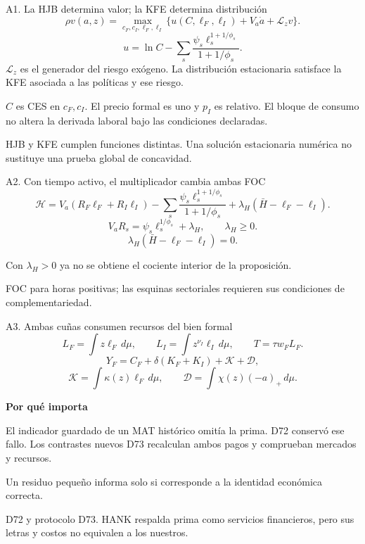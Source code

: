 \documentclass[aspectratio=169,11pt]{beamer}
\newcommand{\source}[1]{\par\vfill{\fontsize{8}{9.5}\selectfont\color{Gray}#1\par}}
\newcommand{\takeaway}[1]{\par\vspace{2mm}\begingroup\setlength{\fboxsep}{2.2mm}\colorbox{Pale}{\begin{minipage}{\dimexpr\linewidth-4.4mm\relax}\small\raggedright #1\end{minipage}}\endgroup\par}
\newcommand{\labeltext}[1]{\par{\small\bfseries\color{Teal}#1\par}\vspace{1.5mm}}
\newcommand{\back}[1]{\hfill\hyperlink{#1}{\beamerreturnbutton{Volver}}}
\begin{document}
\begin{frame}[label=hjb]{A1. La HJB determina valor; la KFE determina distribución}
\[\rho v(a,z)=\max_{c_F,c_I,\ell_F,\ell_I}\{u(C,\ell_F,\ell_I)+V_a\dot a+\mathcal L_zv\}.\]
\[u=\ln C-\sum_s\frac{\psi_s\ell_s^{1+1/\phi_s}}{1+1/\phi_s}.\]
\small $\mathcal L_z$ es el generador del riesgo exógeno. La distribución estacionaria satisface la KFE asociada a las políticas y ese riesgo.\par\vspace{3mm}
$C$ es CES en $c_F,c_I$. El precio formal es uno y $p_I$ es relativo. El bloque de consumo no altera la derivada laboral bajo las condiciones declaradas.
\source{HJB y KFE cumplen funciones distintas. Una solución estacionaria numérica no sustituye una prueba global de concavidad.}\back{hogar}
\end{frame}

\begin{frame}[label=kkt]{A2. Con tiempo activo, el multiplicador cambia ambas FOC}
\[\mathcal H=V_a(R_F\ell_F+R_I\ell_I)-\sum_s\frac{\psi_s\ell_s^{1+1/\phi_s}}{1+1/\phi_s}+\lambda_H(\bar H-\ell_F-\ell_I).\]
\[V_aR_s=\psi_s\ell_s^{1/\phi_s}+\lambda_H,\qquad\lambda_H\geq0.\]
\[\lambda_H(\bar H-\ell_F-\ell_I)=0.\]
\takeaway{Con $\lambda_H>0$ ya no se obtiene el cociente interior de la proposición.}
\source{FOC para horas positivas; las esquinas sectoriales requieren sus condiciones de complementariedad.}\back{foc}
\end{frame}

\begin{frame}[label=recursos]{A3. Ambas cuñas consumen recursos del bien formal}
\[L_F=\int z\ell_F\,d\mu,\qquad L_I=\int z^{\nu_I}\ell_I\,d\mu,\qquad T=\tau w_FL_F.\]
\[Y_F=C_F+\delta(K_F+K_I)+\mathcal K+\mathcal D,\]
\[\mathcal K=\int\kappa(z)\ell_F\,d\mu,\qquad
\mathcal D=\int\chi(z)(-a)_+\,d\mu.\]
\labeltext{Por qué importa}
\small El indicador guardado de un MAT histórico omitía la prima. D72 conservó ese fallo. Los contrastes nuevos D73 recalculan ambos pagos y comprueban mercados y recursos.
\takeaway{Un residuo pequeño informa solo si corresponde a la identidad económica correcta.}
\source{D72 y protocolo D73. HANK respalda prima como servicios financieros, pero sus letras y costos no equivalen a los nuestros.}\back{mercados}
\end{frame}
\end{document}
